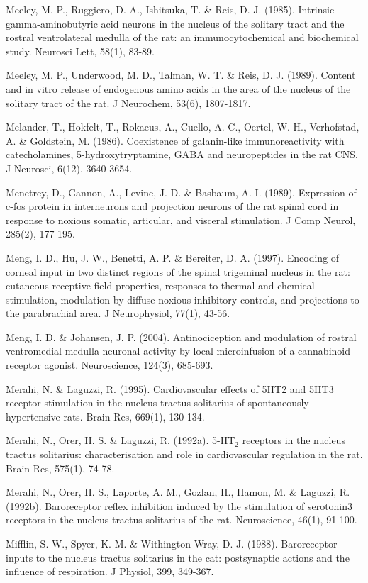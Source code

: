 \documentclass[a4paper,12pt,twoside]{report}
\begin{document}
\begin{singlespacing}
\begin{footnotesize}
Meeley, M. P., Ruggiero, D. A., Ishitsuka, T. \& Reis, D. J. (1985). Intrinsic gamma-aminobutyric acid neurons in the nucleus of the solitary tract and the rostral ventrolateral medulla of the rat: an immunocytochemical and biochemical study. Neurosci Lett, 58(1), 83-89.

Meeley, M. P., Underwood, M. D., Talman, W. T. \& Reis, D. J. (1989). Content and in vitro release of endogenous amino acids in the area of the nucleus of the solitary tract of the rat. J Neurochem, 53(6), 1807-1817.

Melander, T., Hokfelt, T., Rokaeus, A., Cuello, A. C., Oertel, W. H., Verhofstad, A. \& Goldstein, M. (1986). Coexistence of galanin-like immunoreactivity with catecholamines, 5-hydroxytryptamine, GABA and neuropeptides in the rat CNS. J Neurosci, 6(12), 3640-3654.

Menetrey, D., Gannon, A., Levine, J. D. \& Basbaum, A. I. (1989). Expression of c-fos protein in interneurons and projection neurons of the rat spinal cord in response to noxious somatic, articular, and visceral stimulation. J Comp Neurol, 285(2), 177-195.

Meng, I. D., Hu, J. W., Benetti, A. P. \& Bereiter, D. A. (1997). Encoding of corneal input in two distinct regions of the spinal trigeminal nucleus in the rat: cutaneous receptive field properties, responses to thermal and chemical stimulation, modulation by diffuse noxious inhibitory controls, and projections to the parabrachial area. J Neurophysiol, 77(1), 43-56.

Meng, I. D. \& Johansen, J. P. (2004). Antinociception and modulation of rostral ventromedial medulla neuronal activity by local microinfusion of a cannabinoid receptor agonist. Neuroscience, 124(3), 685-693.

Merahi, N. \& Laguzzi, R. (1995). Cardiovascular effects of 5HT2 and 5HT3 receptor stimulation in the nucleus tractus solitarius of spontaneously hypertensive rats. Brain Res, 669(1), 130-134.

Merahi, N., Orer, H. S. \& Laguzzi, R. (1992a). 5-HT$_{2}$ receptors in the nucleus tractus solitarius: characterisation and role in cardiovascular regulation in the rat. Brain Res, 575(1), 74-78.

Merahi, N., Orer, H. S., Laporte, A. M., Gozlan, H., Hamon, M. \& Laguzzi, R. (1992b). Baroreceptor reflex inhibition induced by the stimulation of serotonin3 receptors in the nucleus tractus solitarius of the rat. Neuroscience, 46(1), 91-100.

Mifflin, S. W., Spyer, K. M. \& Withington-Wray, D. J. (1988). Baroreceptor inputs to the nucleus tractus solitarius in the cat: postsynaptic actions and the influence of respiration. J Physiol, 399, 349-367.


\end{footnotesize}
\end{singlespacing}
\end{document}
